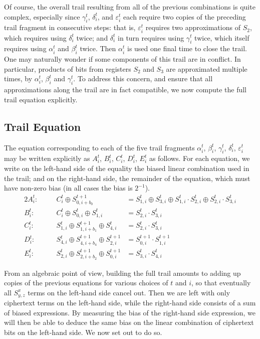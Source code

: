 \documentclass{llncs}
\begin{document}
Of course, the overall trail resulting from all of the previous combinations is quite complex, especially since $\gamma^t_i$, $\delta^t_i$, and $\varepsilon^t_i$ each require two copies of the preceding trail fragment in consecutive steps: that is, $\varepsilon^t_i$ requires two approximations of $S_2$, which requires using $\delta^t_i$ twice; and $\delta^t_i$ in turn requires using $\gamma^t_i$ twice, which itself requires using $\alpha^t_i$ and $\beta^t_i$ twice. Then $\alpha^t_i$ is used one final time to close the trail. One may naturally wonder if some components of this trail are in conflict. In particular, products of bits from registers $S_2$ and $S_3$ are approximated multiple times, by $\alpha^t_i$, $\beta^t_i$ and $\gamma^t_i$. To address this concern, and ensure that all approximations along the trail are in fact compatible, we now compute the full trail equation explicitly.

\subsection{Trail Equation}
\label{sec:minitraileq}

The equation corresponding to each of the five trail fragments $\alpha^t_i$, $\beta^t_i$, $\gamma^t_i$, $\delta^t_i$, $\varepsilon^t_i$ may be written explicitly as $A^t_i$, $B^t_i$, $C^t_i$, $D^t_i$, $E^t_i$ as follows. For each equation, we write on the left-hand side of the equality the biased linear combination used in the trail; and on the right-hand side, the remainder of the equation, which must have non-zero bias (in all cases the bias is $2^{-1}$).
\begin{alignat*}{2}
A^t_i:\quad&& C^t_i \oplus S^{t+1}_{0,i+b_0} &= S^t_{1,i} \oplus S^t_{3,i} \oplus S^t_{1,i} \cdot S^t_{2,i} \oplus S^t_{2,i} \cdot S^t_{3,i}\\
B^t_i:\quad&& C^t_i \oplus S^t_{0,i} \oplus S^t_{1,i} &= S^t_{2,i} \cdot S^t_{3,i} \\
C^t_i:\quad&& S^t_{1,i} \oplus S^{t+1}_{1,i+b_1} \oplus S^t_{4,i} &= S^t_{2,i} \cdot S^t_{3,i}\\
D^t_i:\quad&& S^t_{4,i} \oplus S^{t+1}_{4,i+b_4} \oplus S^{t+1}_{2,i} &= S^{t+1}_{0,i} \cdot S^{t+1}_{1,i}\\
E^t_i:\quad&& S^t_{2,i} \oplus S^{t+1}_{2,i+b_2} \oplus S^{t+1}_{0,i} &= S^t_{3,i} \cdot S^t_{4,i}
\end{alignat*}

From an algebraic point of view, building the full trail amounts to adding up copies of the previous equations for various choices of $t$ and $i$, so that eventually all $S^x_{y,z}$ terms on the left-hand side cancel out. Then we are left with only ciphertext terms on the left-hand side, while the right-hand side consists of a sum of biased expressions. By measuring the bias of the right-hand side expression, we will then be able to deduce the same bias on the linear combination of ciphertext bits on the left-hand side. We now set out to do so.
\end{document}
